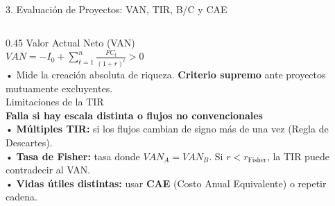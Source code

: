 \documentclass[aspectratio=169, 10pt]{beamer}
\begin{document}
\begin{frame}{3. Evaluación de Proyectos: VAN, TIR, B/C y CAE}
\begin{columns}[T]
    \begin{column}{0.45\textwidth}
      {\scriptsize\color{grisTexto}Valor Actual Neto (VAN)}\\[1pt]
      {\large\color{azulPrincipal}\textbf{\(VAN = -I_0 + \sum_{t=1}^n \frac{FC_t}{(1+r)^t} > 0\)}}\\[4pt]
      {\scriptsize
        • Mide la creación absoluta de riqueza. \textbf{Criterio supremo} ante proyectos mutuamente excluyentes.\\[4pt]
      }
      {\scriptsize\color{grisTexto}Limitaciones de la TIR}\\[1pt]
      {\normalsize\color{rojoAcento}\textbf{Falla si hay escala distinta o flujos no convencionales}}\\[4pt]
      {\scriptsize
        • \textbf{Múltiples TIR:} si los flujos cambian de signo más de una vez (Regla de Descartes).\\
        • \textbf{Tasa de Fisher:} tasa donde \(VAN_A = VAN_B\). Si \(r < r_{\text{Fisher}}\), la TIR puede contradecir al VAN.\\
        • \textbf{Vidas útiles distintas:} usar \textbf{CAE} (Costo Anual Equivalente) o repetir cadena.
      }
    \end{column}
  \end{columns}

\end{frame}
\end{document}
